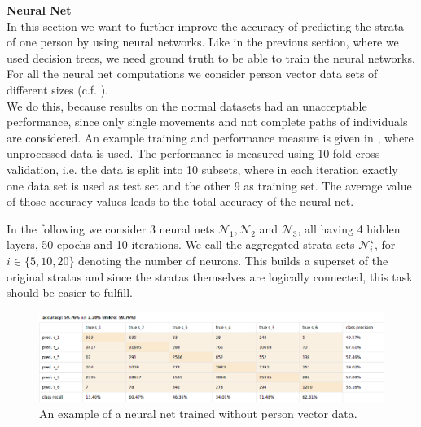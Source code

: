 

\textbf{Neural Net} \label{subsec: neural net}\\
	In this section we want to further improve the accuracy of predicting the strata of one person by using neural networks. Like in the previous section, where we used decision trees, we need ground truth to be able to train the neural networks. For all the neural net computations we consider person vector data sets of different sizes (c.f. ).\\	
	We do this, because results on the normal datasets had an unacceptable performance, since only single movements and not complete paths of individuals are considered. An example training and performance measure is given in , where unprocessed data is used. The performance is measured using 10-fold cross validation, i.e. the data is split into 10 subsets, where in each iteration exactly one data set is used as test set and the other 9 as training set. The average value of those accuracy values leads to the total accuracy of the neural net.

	
	In the following we consider 3 neural nets $\mathcal{N}_1,\mathcal{N}_2$ and $\mathcal{N}_3$, all having 4 hidden layers, 50 epochs and 10 iterations.	
	We call the aggregated strata sets $\mathcal{N}_i^\star$, for $i \in \{5,10,20\}$ denoting the number of neurons. This builds a superset of the original stratas and since the stratas themselves are logically connected, this task should be easier to fulfill.\\
		\begin{figure}[H]
		\vspace*{-1em}
		\centering
		\includegraphics[scale = 0.4]{src/pic/NN_without_vector.png}
		\caption{An example of a neural net trained without person vector data.}
		\label{fig: NN without vector}
	\end{figure}
	\vspace*{-1.5em}
	

